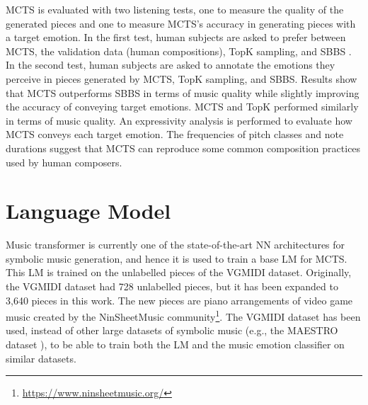 MCTS is evaluated with two listening tests, one to measure the quality of the generated pieces and one to measure MCTS's accuracy in generating pieces with a target emotion. In the first test, human subjects are asked to prefer between MCTS, the validation data (human compositions), TopK sampling, and SBBS \cite{ferreira2020computer}. In the second test, human subjects are asked to annotate the emotions they perceive in pieces generated by MCTS, TopK sampling, and SBBS. Results show that MCTS outperforms SBBS in terms of music quality while slightly improving the accuracy of conveying target emotions. MCTS and TopK performed similarly in terms of music quality. An expressivity analysis \cite{smith2010analyzing} is performed to evaluate how MCTS conveys each target emotion. The frequencies of pitch classes and note durations suggest that MCTS can reproduce some common composition practices used by human composers.



\section{Language Model}

Music transformer \cite{huang2018music} is currently one of the state-of-the-art NN architectures for symbolic music generation, and hence it is used to train a base LM for MCTS. This LM is trained on the unlabelled pieces of the VGMIDI dataset. Originally, the VGMIDI dataset had 728 unlabelled pieces, but it has been expanded to 3,640 pieces in this work. The new pieces are piano arrangements of video game music created by the NinSheetMusic community\footnote{\url{https://www.ninsheetmusic.org/}}. The VGMIDI dataset has been used, instead of other large datasets of symbolic music (e.g., the MAESTRO dataset \cite{hawthorne2018enabling}), to be able to train both the LM and the music emotion classifier on similar datasets.

